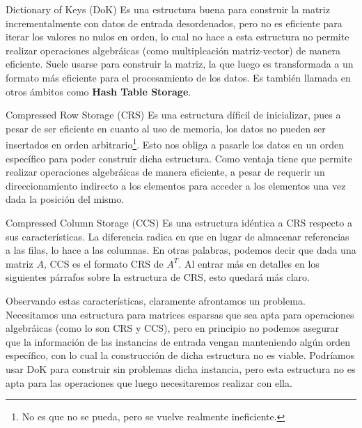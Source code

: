 \smallskip
\begin{LaTeXdescription}
    \item[Dictionary of Keys (DoK)] Es una estructura buena para construir la
        matriz incrementalmente con datos de entrada desordenados, pero no es
        eficiente para iterar los valores no nulos en orden, lo cual no hace a
        esta estructura no permite realizar operaciones algebr\'aicas (como
        multiplcaci\'on matriz-vector) de manera eficiente. Suele usarse para
        construir la matriz, la que luego es transformada a un formato m\'as
        eficiente para el procesamiento de los datos\cite{wiki_dok}. Es
        tambi\'en llamada en otros \'ambitos como \textbf{Hash Table
        Storage}\cite{alglib_sparse}.

    \item[Compressed Row Storage (CRS)] Es una estructura d\'ificil de
        inicializar, pues a pesar de ser eficiente en cuanto al uso de memoria,
        los datos no pueden ser insertados en orden arbitrario\footnote{No es
        que no se pueda, pero se vuelve realmente ineficiente.}. Esto nos obliga a
        pasarle los datos en un orden espec\'ifico para poder construir dicha
        estructura. Como ventaja tiene que permite realizar operaciones
        algebr\'aicas de manera eficiente, a pesar de requerir un direccionamiento
        indirecto a los elementos para acceder a los elementos una vez dada la
        posici\'on del mismo\cite{wiki_dok}\cite{alglib_sparse}.

    \item[Compressed Column Storage (CCS)] Es una estructura id\'entica a CRS
        respecto a sus caracter\'isticas. La diferencia radica en que en lugar
        de almacenar referencias a las filas, lo hace a las columnas. En otras
        palabras, podemos decir que dada una matriz $A$, CCS es el formato CRS de
        $A^T$\cite{netlib_ccs}. Al entrar m\'as en detalles en los siguientes
        p\'arrafos sobre la estructura de CRS, esto quedar\'a m\'as claro.
\end{LaTeXdescription}
\medskip

\par Observando estas caracter\'isticas, claramente afrontamos un problema.
Necesitamos una estructura para matrices esparsas que sea apta para operaciones
algebr\'aicas (como lo son CRS y CCS), pero en principio no podemos asegurar que
la informaci\'on de las instancias de entrada vengan manteniendo alg\'un orden
espec\'ifico, con lo cual la construcci\'on de dicha estructura no es viable.
Podr\'iamos usar DoK para construir sin problemas dicha instancia, pero esta
estructura no es apta para las operaciones que luego necesitaremos realizar con
ella.

